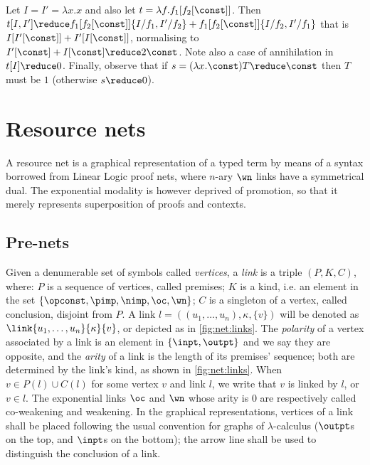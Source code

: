 \begin{example}
\label{ex:terms}
Let
  $I = I' = \lambda x . x$
and also let
  $t = \lambda f. f_1 [ f_2 [\const] ]$.
Then
  $t [I,I'] \reduce
    f_1 [ f_2 [\const]] \lbrace I/f_1, I'/f_2 \rbrace + 
    f_1 [ f_2 [\const]] \lbrace I/f_2, I'/f_1 \rbrace$
that is $I [I' [\const]] + I' [I [\const]]$,
normalising to
  $I'[\const] + I [\const]
    \reduce 2\const$.
Note also a case of annihilation in $t[I] \reduce 0$.
Finally, observe that if $s = (\lambda x.\const) T \reduce \const$ then $T$ 
must be $1$ (otherwise $s \reduce 0$).
\end{example}


\section{Resource nets}
\label{sec:nets}

A resource net is a graphical representation of a typed term by means of a 
syntax borrowed from Linear Logic proof nets, where $n$-ary $\wn$ links have 
a symmetrical dual.
The exponential modality is however deprived of promotion, so that it merely 
represents superposition of proofs and contexts.

\subsection{Pre-nets}
\label{sec:nets:prenets}

\begin{definition}[Links] \label{def:link}
Given a denumerable set of symbols called \textit{vertices}, a \textit{link} 
is a triple $(P, K, C)$, where:
$P$ is a sequence of vertices, called premises;
$K$ is a kind, i.e. an element in the set
  $\lbrace \opconst, \pimp, \nimp, \oc, \wn \rbrace$;
$C$ is a singleton of a vertex, called conclusion, disjoint from $P$.
A link $l = ((u_1, \ldots, u_n), \kappa, \lbrace v \rbrace)$ will be denoted 
as $\link{u_1, \ldots, u_n}{\kappa}{v}$, or depicted as in 
\autoref{fig:net:links}.
The \textit{polarity} of a vertex associated by a link is an element in 
$\lbrace \inpt,\outpt \rbrace$
and we say they are opposite,
and the \textit{arity} of a link is the length of its premises' sequence;
both are determined by the link's kind,
as shown in \autoref{fig:net:links}.
When $v \in P(l) \cup C(l)$ for some vertex $v$ and link $l$, we write that 
$v$ is linked by $l$, or $v \in l$.
The exponential links $\oc$ and $\wn$ whose arity is $0$ are 
respectively called co-weakening and weakening.
In the graphical representations, vertices of a link shall be placed following 
the usual convention for graphs of $\lambda$-calculus ($\outpt$s on the top, 
and $\inpt$s on the bottom); the arrow line shall be used to distinguish 
the conclusion of a link.
\end{definition}

